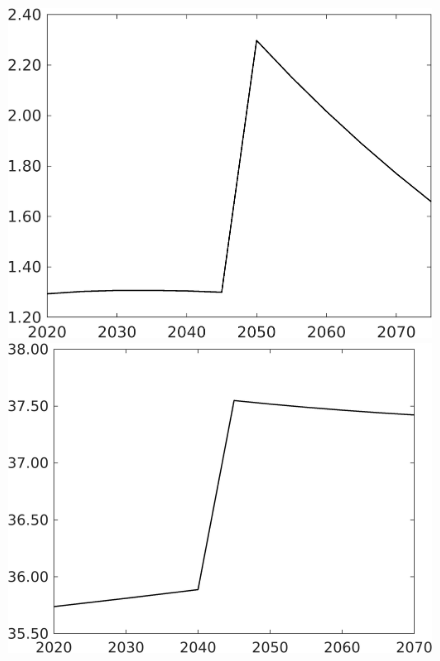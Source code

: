 \documentclass[12pt]{article}
\begin{document}
\begin{figure}[h!!]
\begin{minipage}[]{0.32\textwidth}
	\end{minipage}
	\begin{minipage}[]{0.32\textwidth}
		\includegraphics[width=1\textwidth]{../../codding_model/own_basedOnFried/optimalPol_010922_revision/figures/all_13Sept22/CompTaufPER_bytaul_Reg0_sn_spillover0_nsk0_xgr0_knspil1_sep0_LFlimit1_emsbase0_countec0_GovRev0_etaa0.79_lgd0.png}
	\end{minipage}		
	\begin{minipage}[]{0.32\textwidth}
		\includegraphics[width=1\textwidth]{../../codding_model/own_basedOnFried/optimalPol_010922_revision/figures/all_13Sept22/CompTaufPER_bytaul_Reg0_gAf_spillover0_nsk0_xgr0_knspil1_sep0_LFlimit1_emsbase0_countec0_GovRev0_etaa0.79_lgd0.png}

\end{minipage}
\end{figure}
\end{document}
